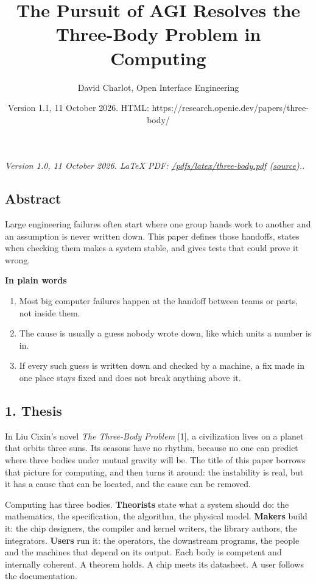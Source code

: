 \documentclass[
  10pt,
]{article}
\title{The Pursuit of AGI Resolves the Three-Body Problem in Computing}
\author{David Charlot, Open Interface Engineering}
\date{Version 1.1, 11 October 2026. HTML:
https://research.openie.dev/papers/three-body/}
\providecommand{\tightlist}{%
  \setlength{\itemsep}{0pt}\setlength{\parskip}{0pt}}
\begin{document}
\maketitle

{
\setcounter{tocdepth}{2}
\tableofcontents
}
\emph{Version 1.0, 11 October 2026. LaTeX PDF:
\href{https://research.openie.dev/pdfs/latex/three-body.pdf}{/pdfs/latex/three-body.pdf}
(\href{https://research.openie.dev/pdfs/latex/three-body.tex}{source})..}

\subsection{Abstract}\label{abstract}

Large engineering failures often start where one group hands work to
another and an assumption is never written down. This paper defines
those handoffs, states when checking them makes a system stable, and
gives tests that could prove it wrong.

\textbf{In plain words}

\begin{enumerate}
\def\labelenumi{\arabic{enumi}.}
\tightlist
\item
  Most big computer failures happen at the handoff between teams or
  parts, not inside them.
\item
  The cause is usually a guess nobody wrote down, like which units a
  number is in.
\item
  If every such guess is written down and checked by a machine, a fix
  made in one place stays fixed and does not break anything above it.
\end{enumerate}

\subsection{1. Thesis}\label{thesis}

In Liu Cixin's novel \emph{The Three-Body Problem} {[}1{]}, a
civilization lives on a planet that orbits three suns. Its seasons have
no rhythm, because no one can predict where three bodies under mutual
gravity will be. The title of this paper borrows that picture for
computing, and then turns it around: the instability is real, but it has
a cause that can be located, and the cause can be removed.

Computing has three bodies. \textbf{Theorists} state what a system
should do: the mathematics, the specification, the algorithm, the
physical model. \textbf{Makers} build it: the chip designers, the
compiler and kernel writers, the library authors, the integrators.
\textbf{Users} run it: the operators, the downstream programs, the
people and the machines that depend on its output. Each body is
competent and internally coherent. A theorem holds. A chip meets its
datasheet. A user follows the documentation.
\end{document}

